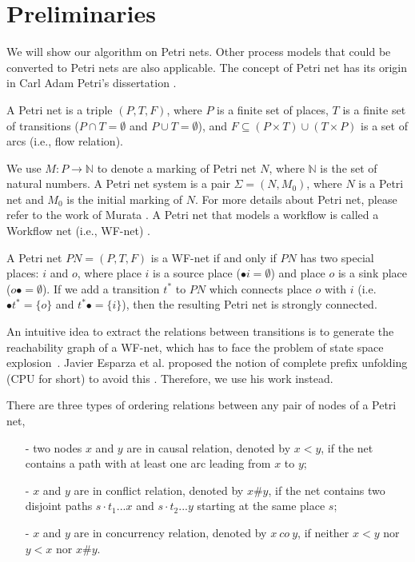 \documentclass{llncs}
\begin{document}
\section{Preliminaries}\label{sec:preliminaries}
We will show our algorithm on Petri nets. Other process models that could be converted to Petri nets are also applicable. The concept of Petri net has its origin in Carl Adam Petri's dissertation \cite{petri1966kommunikation}.

\begin{definition}\label{def:petrinet}
A Petri net is a triple $(P,T,F)$, where $P$ is a finite set of places, $T$ is a finite set of transitions ($P\cap T=\emptyset$ and $P\cup T=\emptyset$), and $F\subseteq(P\times T)\cup(T\times P)$ is a set of arcs (i.e., flow relation).
\end{definition}

We use $M:P\rightarrow\mathbb{N}$ to denote a marking of Petri net $N$, where $\mathbb{N}$ is the set of natural numbers. A Petri net system is a pair $\Sigma=(N,M_{0})$, where $N$ is a Petri net and $M_{0}$ is the initial marking of $N$. For more details about Petri net, please refer to the work of Murata \cite{murata1989petri}. A Petri net that models a workflow is called a Workflow net (i.e., WF-net) \cite{van1998application}.

\begin{definition}[WF-net]\label{def:wfnet}
A Petri net $PN=(P,T,F)$ is a WF-net if and only if $PN$ has two special places: $i$ and $o$, where place $i$ is a source place ($\bullet i=\emptyset$) and place $o$ is a sink place ($o\bullet =\emptyset$). If we add a transition $t^{*}$ to $PN$ which connects place $o$ with $i$ (i.e. $\bullet t^{*}=\{o\}$ and $t^{*}\bullet=\{i\}$), then the resulting Petri net is strongly connected.
\end{definition}

An intuitive idea to extract the relations between transitions is to generate the reachability graph of a WF-net, which has to face the problem of state space explosion~\cite{mcmillan1995technique}. Javier Esparza et al. proposed the notion of complete prefix unfolding (CPU for short) to avoid this \cite{esparza2002improvement}. Therefore, we use his work instead.

\begin{definition}\label{def:orderingRelations}
There are three types of ordering relations between any pair of nodes of a Petri net,
	\begin{itemize}
		\item[-] two nodes $x$ and $y$ are in causal relation, denoted by $x<y$, if the net contains a path with at least one arc leading from $x$ to $y$;
		\item[-] $x$ and $y$ are in conflict relation, denoted by $x\#y$, if the net contains two disjoint paths $s\cdot t_{1}...x$ and $s\cdot t_{2}...y$ starting at the same place $s$;
		\item[-] $x$ and $y$ are in concurrency relation, denoted by $x~co~y$, if neither $x<y$ nor $y<x$ nor $x\#y$.
	\end{itemize}
\end{definition}
\end{document}
